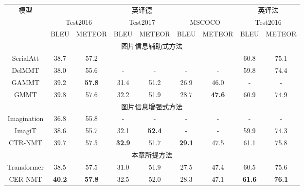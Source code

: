 
\begin{table}[!htbp]
    \label{tab:4_ende_enfr}
    \centering
    \footnotesize%
    \setlength{\tabcolsep}{4pt}%
    \renewcommand{\arraystretch}{1.2}%
\begin{tabular}{ccccccccc}
\hline
 \multirow{3}{*}{模型} & \multicolumn{6}{c}{英译德} & \multicolumn{2}{c}{英译法} \\
\cmidrule(r){2-7} \cmidrule(r){8-9}%
       & \multicolumn{2}{c}{Test2016} & \multicolumn{2}{c}{Test2017} & \multicolumn{2}{c}{MSCOCO} & \multicolumn{2}{c}{Test2016} \\
\cline{2-9}%
              &    BLEU & METEOR &     BLEU & METEOR &     BLEU & METEOR &     BLEU & METEOR \\
\hline
\multicolumn{9}{c}{图片信息辅助式方法} \\
\hline
SerialAtt      & 38.7 & 57.2 & - & - & - & - & 60.8 & 75.1 \\
DelMMT           & 38.0 & 55.6 & - & - & - & - & 59.8 & 74.4 \\
GAMMT      & 39.2 & {\textbf{57.8}} & 31.4 & 51.2 & 26.9 & 46.0 & - & - \\
GMMT             & 39.8 & 57.6 & 32.2 & 51.9 & 28.7 & {\textbf{47.6}} & 60.9 & 74.9 \\
\hline
\multicolumn{9}{c}{图片信息增强式方法} \\
\hline
Imagination      & 36.8 & 55.8 & - & - & - & - & - & - \\
ImagiT   & 38.6 & 55.7 & 32.1 & {\textbf{52.4}} & - & - & 59.9 & 74.3 \\
CTR-NMT             & 39.7 & 57.5 & {\textbf{32.9}} & 51.7 & {\textbf{29.1}} & 47.5 & 61.1 & 75.8 \\
\hline
\multicolumn{9}{c}{本章所提方法} \\
\hline
Transformer             & 38.5 & 57.5 & 31.0 & 51.9 & 27.5 & 47.4 & 60.5 & 75.6 \\
CER-NMT          & {\textbf{40.2}} & {\textbf{57.8}} & 32.5 & 52.0 & 28.3 & 47.1 & {\textbf{61.6}} & {\textbf{76.1}} \\
\bottomrule
\end{tabular}
\end{table}